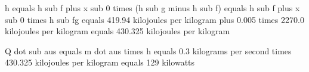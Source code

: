 h equals h sub f plus x sub 0 times (h sub g minus h sub f) equals h sub f plus x sub 0 times h sub fg equals 419.94 kilojoules per kilogram plus 0.005 times 2270.0 kilojoules per kilogram equals 430.325 kilojoules per kilogram

Q dot sub aus equals m dot aus times h equals 0.3 kilograms per second times 430.325 kilojoules per kilogram equals 129 kilowatts
